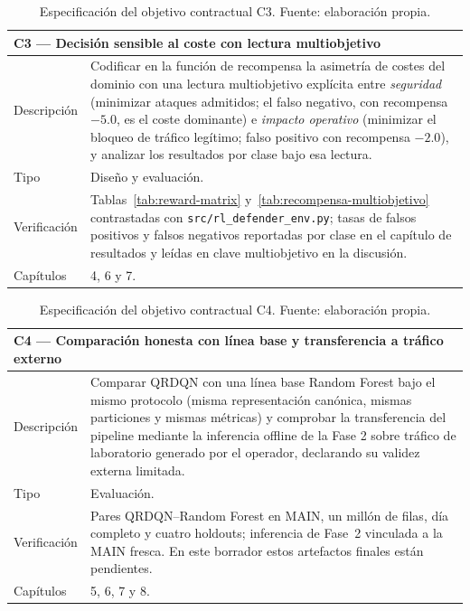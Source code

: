 \begin{table}[htbp]
\centering
\small
\begin{tabular}{lp{10.4cm}}
\toprule
\multicolumn{2}{p{12.6cm}}{\textbf{C3 --- Decisión sensible al coste con lectura multiobjetivo}} \\
\midrule
Descripción & Codificar en la función de recompensa la asimetría de costes del dominio con una lectura multiobjetivo explícita entre \emph{seguridad} (minimizar ataques admitidos; el falso negativo, con recompensa $-5.0$, es el coste dominante) e \emph{impacto operativo} (minimizar el bloqueo de tráfico legítimo; falso positivo con recompensa $-2.0$), y analizar los resultados por clase bajo esa lectura. \\
Tipo & Diseño y evaluación. \\
Verificación & Tablas~\ref{tab:reward-matrix} y~\ref{tab:recompensa-multiobjetivo} contrastadas con \texttt{src/rl\_defender\_env.py}; tasas de falsos positivos y falsos negativos reportadas por clase en el capítulo de resultados y leídas en clave multiobjetivo en la discusión. \\
Capítulos & 4, 6 y 7. \\
\bottomrule
\end{tabular}
\caption[Objetivo contractual C3]{Especificación del objetivo contractual C3. Fuente: elaboración propia.}
\label{tab:obj-c3}
\end{table}

\begin{table}[htbp]
\centering
\small
\begin{tabular}{lp{10.4cm}}
\toprule
\multicolumn{2}{p{12.6cm}}{\textbf{C4 --- Comparación honesta con línea base y transferencia a tráfico externo}} \\
\midrule
Descripción & Comparar QRDQN con una línea base Random Forest bajo el mismo protocolo (misma representación canónica, mismas particiones y mismas métricas) y comprobar la transferencia del pipeline mediante la inferencia offline de la Fase 2 sobre tráfico de laboratorio generado por el operador, declarando su validez externa limitada. \\
Tipo & Evaluación. \\
Verificación & Pares QRDQN--Random Forest en MAIN, un millón de filas, día completo y cuatro holdouts; inferencia de Fase~2 vinculada a la MAIN fresca. En este borrador estos artefactos finales están pendientes. \\
Capítulos & 5, 6, 7 y 8. \\
\bottomrule
\end{tabular}
\caption[Objetivo contractual C4]{Especificación del objetivo contractual C4. Fuente: elaboración propia.}
\label{tab:obj-c4}
\end{table}

